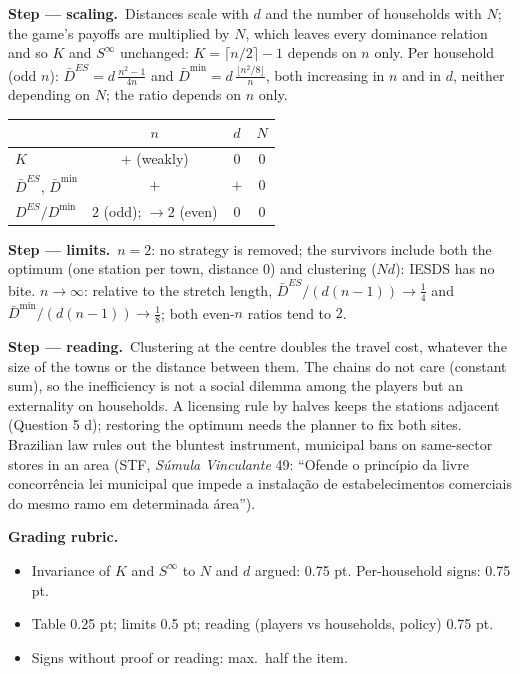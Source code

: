 \documentclass[11pt,a4paper]{article}
\newcommand{\passo}[2]{\par\smallskip\noindent\textbf{Step --- #1.}~#2}
\newcommand{\rubrica}[1]{\par\smallskip\noindent\textbf{Grading rubric.}\begin{itemize}[leftmargin=1.4em,topsep=1pt]#1\end{itemize}}
\begin{document}
\begin{sol}
\passo{scaling}{Distances scale with $d$ and the number of households with $N$; the game's payoffs
are multiplied by $N$, which leaves every dominance relation and so $K$ and $S^\infty$ unchanged:
$K=\lceil n/2\rceil-1$ depends on $n$ only. Per household (odd $n$):
$\bar D^{ES}=d\,\tfrac{n^2-1}{4n}$ and $\bar D^{\min}=d\,\tfrac{\lfloor n^2/8\rfloor}{n}$, both
increasing in $n$ and in $d$, neither depending on $N$; the ratio depends on $n$ only.}
\begin{center}
\begin{tabular}{lccc}\toprule
 & $n$ & $d$ & $N$\\\midrule
$K$ & $+$ (weakly) & $0$ & $0$\\
$\bar D^{ES}$, $\bar D^{\min}$ & $+$ & $+$ & $0$\\
$D^{ES}/D^{\min}$ & $2$ (odd); $\to2$ (even) & $0$ & $0$\\\bottomrule
\end{tabular}
\end{center}
\passo{limits}{$n=2$: no strategy is removed; the survivors include both the optimum (one station per
town, distance $0$) and clustering ($Nd$): IESDS has no bite. $n\to\infty$: relative to the stretch
length, $\bar D^{ES}/(d(n-1))\to\tfrac14$ and $\bar D^{\min}/(d(n-1))\to\tfrac18$; both even-$n$ ratios
tend to $2$.}
\passo{reading}{Clustering at the centre doubles the travel cost, whatever the size of the towns or
the distance between them. The chains do not care (constant sum), so the inefficiency is not a social
dilemma among the players but an externality on households. A licensing rule by halves keeps the
stations adjacent (Question 5 d); restoring the optimum needs the planner to fix both sites. Brazilian
law rules out the bluntest instrument, municipal bans on same-sector stores in an area (STF,
\emph{Súmula Vinculante} 49: ``Ofende o princípio da livre concorrência lei municipal que impede a
instalação de estabelecimentos comerciais do mesmo ramo em determinada área'').}
\rubrica{
\item Invariance of $K$ and $S^\infty$ to $N$ and $d$ argued: 0.75 pt. Per-household signs: 0.75 pt.
\item Table 0.25 pt; limits 0.5 pt; reading (players vs households, policy) 0.75 pt.
\item Signs without proof or reading: max.\ half the item.
}
\end{sol}
\end{document}
